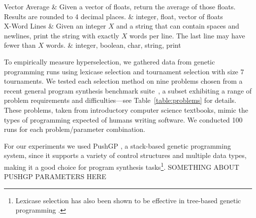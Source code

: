 \documentclass{sig-alternate}
\begin{document}
\begin{table}[t]
\begin{tabu}
		Vector Average             & Given a vector of floats, return the average of those floats. Results are rounded to 4 decimal places. & integer, float, vector of floats \\
		X-Word Lines               & Given an integer $X$  and a string that can contain spaces and newlines, print the string with exactly $X$ words per line. The last line may have fewer than $X$ words. & integer, boolean, char, string, print \\
		\bottomrule
	\end{tabu}
\end{table}


To empirically measure hyperselection, we gathered data from genetic programming runs using lexicase selection and tournament selection with size 7 tournaments. We tested each selection method on nine problems chosen from a recent general program synthesis benchmark suite~\cite{Helmuth:2015:GECCO}, a subset exhibiting a range of problem requirements and difficulties---see Table~\ref{table:problems} for details. These problems, taken from introductory computer science textbooks, mimic the types of programming expected of humans writing software. We conducted 100 runs for each problem/parameter combination.

For our experiments we used PushGP \cite{spector:2002:GPEM, 1068292}, a stack-based genetic programming system, since it supports a variety of control structures and multiple data types, making it a good choice for program synthesis tasks\footnote{Lexicase selection has also been shown to be effective in tree-based genetic programming \cite{Helmuth:2014:ieeeTEC, Krawiec:2015:GECCO:smgpWorkshop}.}. SOMETHING ABOUT PUSHGP PARAMETERS HERE
\end{document}
